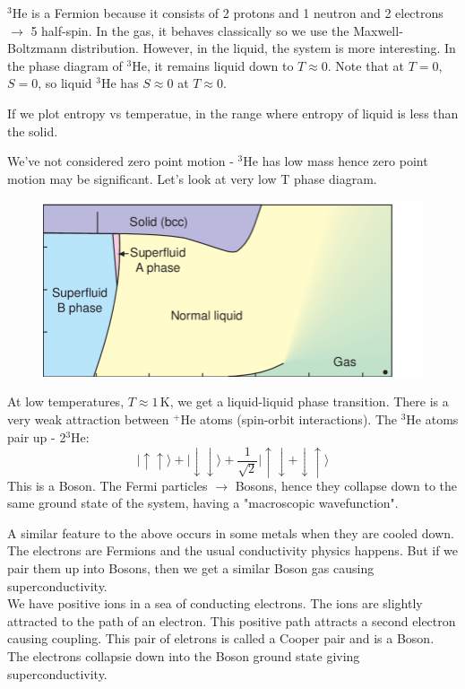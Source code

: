 \documentclass[a4paper, 11pt, normalem]{report}
\begin{document}
\begin{example}
    $^3$He is a Fermion because it consists of 2 protons and 1 neutron and 2 electrons $\to$ 5 half-spin. 
    In the gas, it behaves classically so we use the Maxwell-Boltzmann distribution. However, in the liquid, the system is more interesting. 
    In the phase diagram of $^3$He, it remains liquid down to $T \approx 0$. 
    Note that at $T=0$, $S=0$, so liquid $^3$He has $S\approx0$ at $T\approx0$.

    If we plot entropy vs temperatue, in the range where entropy of liquid is less than the solid. 

    We've not considered zero point motion - $^3$He has low mass hence zero point motion may be significant. 
    Let's look at very low T phase diagram.
    \begin{figure}[H]
        \centering
        \includegraphics[scale=0.5]{he3.png}
    \end{figure}

    At low temperatures, $T\approx1\,$K, we get a liquid-liquid phase transition. 
    There is a very weak attraction between $^+$He atoms (spin-orbit interactions).
    The $^3$He atoms pair up - 2$^3$He:
    \begin{equation}
        |\uparrow\uparrow\rangle + |\downarrow\downarrow\rangle + \frac{1}{\sqrt{2}}|\uparrow\downarrow + \downarrow\uparrow\rangle
    \end{equation}
    This is a Boson.
    The Fermi particles $\to$ Bosons, hence they collapse down to the same ground state of the system, having a "macroscopic wavefunction".
\end{example}

A similar feature to the above occurs in some metals when they are cooled down. 
The electrons are Fermions and the usual conductivity physics happens. 
But if we pair them up into Bosons, then we get a similar Boson gas causing superconductivity. \\
We have positive ions in a sea of conducting electrons. 
The ions are slightly attracted to the path of an electron.
This positive path attracts a second electron causing coupling. 
This pair of eletrons is called a Cooper pair and is a Boson.
The electrons collapsie down into the Boson ground state giving superconductivity.
\end{document}
